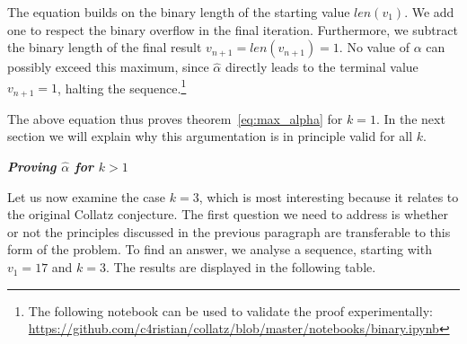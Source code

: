\documentclass{SciPress_2015}
\renewcommand{\subsection}[1]{\textit{\textbf{#1}}}
\begin{document}
The equation builds on the binary length of the starting value $len(v_1)$. We add one to respect the binary overflow in the final iteration. Furthermore, we subtract the binary length of the final result $v_{n+1}=len(v_{n+1})=1$. No value of $\alpha$ can possibly exceed this maximum, since $\hat\alpha$ directly leads to the terminal value $v_{n+1}=1$, halting the sequence.\footnote{The following notebook can be used to validate the proof experimentally:\\ \hspace*{7mm}\url{https://github.com/c4ristian/collatz/blob/master/notebooks/binary.ipynb}}

\par\medskip
The above equation thus proves theorem~\ref{eq:max_alpha} for $k=1$. In the next section we will explain why this argumentation is in principle valid for all $k$.

\vspace{1em}\noindent
\subsection{Proving \boldmath$\hat\alpha$ for \boldmath$k>1$}
\par\noindent
Let us now examine the case $k=3$, which is most interesting because it relates to the original Collatz conjecture. The first question we need to address is whether or not the principles discussed in the previous paragraph are transferable to this form of the problem. To find an answer, we analyse a sequence, starting with $v_1=17$ and $k=3$. The results are displayed in the following table.
\end{document}
